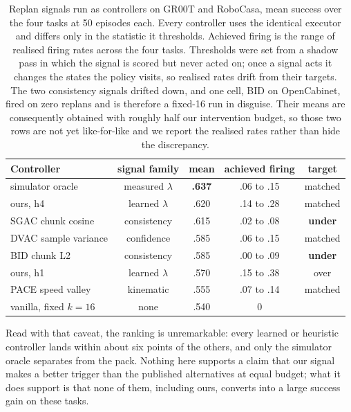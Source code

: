 \begin{table}[t]
\centering
\small
\setlength{\tabcolsep}{4pt}
\begin{tabular}{lcccc}
\toprule
Controller & signal family & mean & achieved firing & target \\
\midrule
simulator oracle & measured $\lambda$ & \textbf{.637} & .06 to .15 & matched \\
ours, h4 & learned $\lambda$ & .620 & .14 to .28 & matched \\
SGAC chunk cosine & consistency & .615 & .02 to .08 & \textbf{under} \\
DVAC sample variance & confidence & .585 & .06 to .15 & matched \\
BID chunk L2 & consistency & .585 & .00 to .09 & \textbf{under} \\
ours, h1 & learned $\lambda$ & .570 & .15 to .38 & over \\
PACE speed valley & kinematic & .555 & .07 to .14 & matched \\
\midrule
vanilla, fixed $k{=}16$ & none & .540 & 0 & \\
\bottomrule
\end{tabular}
\caption{Replan signals run as controllers on GR00T and RoboCasa, mean success
over the four tasks at 50 episodes each. Every controller uses the identical
executor and differs only in the statistic it thresholds. Achieved firing is
the range of realised firing rates across the four tasks. Thresholds were set
from a shadow pass in which the signal is scored but never acted on; once a
signal acts it changes the states the policy visits, so realised rates drift
from their targets. The two consistency signals drifted down, and one cell,
BID on OpenCabinet, fired on zero replans and is therefore a fixed-16 run in
disguise. Their means are consequently obtained with roughly half our
intervention budget, so those two rows are not yet like-for-like and we report
the realised rates rather than hide the discrepancy.
}
\label{tab:baselines}
\end{table}

Read with that caveat, the ranking is unremarkable: every learned or heuristic
controller lands within about six points of the others, and only the simulator
oracle separates from the pack. Nothing here supports a claim that our signal
makes a better trigger than the published alternatives at equal budget; what
it does support is that none of them, including ours, converts into a large
success gain on these tasks.

